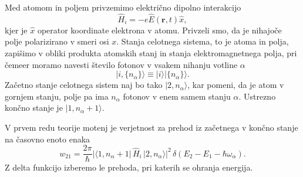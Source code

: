 Med atomom in poljem privzemimo električno dipolno interakcijo 
\begin{equation}
\hat{H}_{i}=-e\hat{E}(\mathbf{r},t)\hat{x},
\label{4.47}
\end{equation}
kjer je $\hat{x}$ operator koordinate elektrona v atomu. Privzeli
smo, da je nihajoče polje polarizirano v smeri osi $x$. Stanja celotnega sistema, 
to je atoma in polja, zapišimo v obliki produkta atomskih stanj in
stanja elektromagnetnega polja, pri čemeer moramo navesti število fotonov
v vsakem nihanju votline $\alpha$
\begin{equation}
|i,\{n_{\alpha}\}\rangle\equiv|i\rangle|\{n_{\alpha}\}\rangle.
\label{4.48}
\end{equation}
Začetno stanje celotnega sistem naj bo tako $|2,n_{\alpha}\rangle$, kar pomeni, da je
atom v gornjem stanju, polje pa ima $n_{\alpha}$ fotonov v enem samem stanju $\alpha$.
Ustrezno končno stanje je $|1,n_{\alpha}+1\rangle$.


V prvem redu teorije motenj je verjetnost za prehod iz začetnega v končno stanje
na časovno enoto enaka
\begin{equation}
w_{21}=\frac{2\pi}{\hbar}|\langle1,n_{\alpha}+
1|\,\hat{H}_{i}\,|2,n_{\alpha}\rangle|^{2}\,
\delta(E_{2}-E_{1}-\hbar\omega_{\alpha}).
\label{4.49}
\end{equation}
Z delta funkcijo izberemo le prehoda, pri katerih se ohranja
energija.


